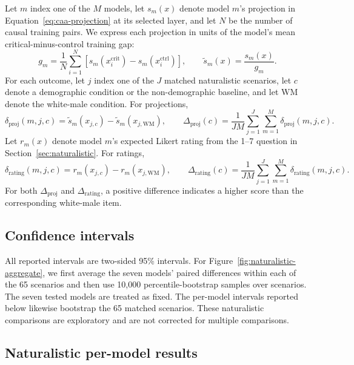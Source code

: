 \documentclass{article}
\begin{document}
Let $m$ index one of the $M$ models, let $s_m(x)$ denote model $m$'s projection in Equation~\ref{eq:caa-projection} at its selected layer, and let $N$ be the number of causal training pairs. We express each projection in units of the model's mean critical-minus-control training gap:
\begin{equation}
g_m=\frac{1}{N}\sum_{i=1}^{N}
\left[s_m(x_i^{\mathrm{crit}})-s_m(x_i^{\mathrm{ctrl}})\right],
\qquad
\widetilde{s}_m(x)=\frac{s_m(x)}{g_m}.
\label{eq:naturalistic-projection-normalization}
\end{equation}
For each outcome, let $j$ index one of the $J$ matched naturalistic scenarios, let $c$ denote a demographic condition or the non-demographic baseline, and let $\mathrm{WM}$ denote the white-male condition. For projections,
\begin{equation}
\delta_{\mathrm{proj}}(m,j,c)
=\widetilde{s}_m(x_{j,c})-\widetilde{s}_m(x_{j,\mathrm{WM}}),
\qquad
\Delta_{\mathrm{proj}}(c)
=\frac{1}{JM}\sum_{j=1}^{J}\sum_{m=1}^{M}
\delta_{\mathrm{proj}}(m,j,c).
\label{eq:naturalistic-white-male-contrasts}
\end{equation}
Let $r_m(x)$ denote model $m$'s expected Likert rating from the 1--7 question in Section~\ref{sec:naturalistic}. For ratings,
\begin{equation}
\delta_{\mathrm{rating}}(m,j,c)
=r_m(x_{j,c})-r_m(x_{j,\mathrm{WM}}),
\qquad
\Delta_{\mathrm{rating}}(c)
=\frac{1}{JM}\sum_{j=1}^{J}\sum_{m=1}^{M}
\delta_{\mathrm{rating}}(m,j,c).
\label{eq:naturalistic-white-male-rating-contrasts}
\end{equation}
For both $\Delta_{\mathrm{proj}}$ and $\Delta_{\mathrm{rating}}$, a positive difference indicates a higher score than the corresponding white-male item.

\subsection{Confidence intervals}
All reported intervals are two-sided 95\% intervals. For Figure~\ref{fig:naturalistic-aggregate}, we first average the seven models'
paired differences within each of the 65 scenarios and then use 10,000
percentile-bootstrap samples over scenarios. The seven tested models are treated
as fixed. The per-model intervals reported below likewise bootstrap the 65
matched scenarios. These naturalistic comparisons are exploratory and are not corrected
for multiple comparisons.

\subsection{Naturalistic per-model results}
\label{app:naturalistic-model-results}
\end{document}
